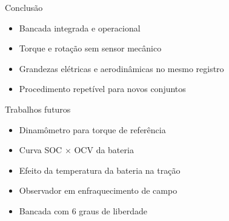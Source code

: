 
\begin{frame}{Conclusão}
  \begin{itemize}
    \item Bancada integrada e operacional
    \item Torque e rotação sem sensor mecânico
    \item Grandezas elétricas e aerodinâmicas no mesmo registro
    \item Procedimento repetível para novos conjuntos
  \end{itemize}

\end{frame}

\begin{frame}{Trabalhos futuros}
  \begin{itemize}
    \item Dinamômetro para torque de referência
    \item Curva SOC $\times$ OCV da bateria
    \item Efeito da temperatura da bateria na tração
    \item Observador em enfraquecimento de campo
    \item Bancada com 6 graus de liberdade
  \end{itemize}
\end{frame}
